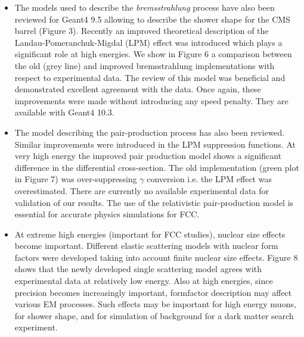 \documentclass[12pt,a4paper]{article}
\begin{document}
\begin{itemize}
\item
  The models used to describe the \emph{bremsstrahlung} process have
  also been reviewed for Geant4 9.5 allowing to describe the shower
  shape for the CMS barrel (Figure 3). Recently an improved theoretical
  description of the Landau-Pomeranchuk-Migdal (LPM) effect was
  introduced which plays a significant role at high energies. We show in
  Figure 6 a comparison between the old (grey line) and improved
  bremsstrahlung implementations with respect to experimental data. The
  review of this model was beneficial and demonstrated excellent
  agreement with the data. Once again, these improvements were made
  without introducing any speed penalty. They are available with Geant4
  10.3.
\item
  The model describing the pair-production process has also been
  reviewed. Similar improvements were introduced in the LPM suppression
  functions. At very high energy the improved pair production model
  shows a significant difference in the differential cross-section. The
  old implementation (green plot in Figure 7) was over-suppressing $ \gamma$
  conversion i.e. the LPM effect was overestimated. There are currently
  no available experimental data for validation of our results. The use
  of the relativistic pair-production model is essential for accurate
  physics simulations for FCC.
\item
  At extreme high energies (important for FCC studies), nuclear size
  effects become important. Different elastic scattering models with
  nuclear form factors were developed taking into account finite nuclear
  size effects. Figure 8 shows that the newly developed single
  scattering model agrees with experimental data at relatively low
  energy. Also at high energies, since precision becomes increasingly
  important, formfactor description may affect various EM processes.
  Such effects may be important for high energy muons, for shower shape,
  and for simulation of background for a dark matter search experiment.
\end{itemize}
\end{document}
